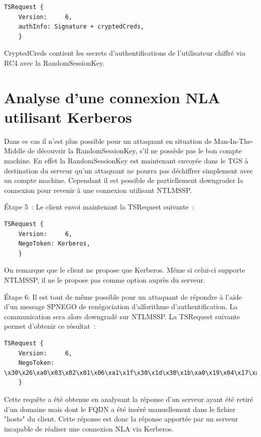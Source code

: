 \begin{lstlisting}[frame=single,basicstyle=\tiny]
TSRequest {
	Version:     6,
	authInfo: Signature + cryptedCreds,
	}
\end{lstlisting}


CryptedCreds contient les secrets d’authentifications de l’utilisateur chiffr\'e via RC4 avec la RandomSessionKey.

\section{Analyse d'une connexion NLA utilisant Kerberos}
Dans ce cas il n’est plus possible pour un attaquant en situation de Man-In-The-Middle de d\'ecouvrir la RandomSessionKey, s’il ne possède pas le bon compte machine. En effet la RandomSessionKey est maintenant envoyée dans le TGS à destination du serveur qu’un attaquant ne pourra pas déchiffrer simplement avec un compte machine.
Cependant il est possible de partiellement downgrader la connexion pour revenir à une connexion utilisant NTLMSSP.

Étape 5 :
Le client envoi maintenant la TSRequest suivante :

\begin{lstlisting}[frame=single,basicstyle=\tiny]
TSRequest {
	Version:     6,
	NegoToken: Kerberos,
	}
\end{lstlisting}


On remarque que le client ne propose que Kerberos. Même si celui-ci supporte NTLMSSP, il ne le propose pas comme option auprès du serveur.

Étape 6: 
Il est tout de même possible pour un attaquant de r\'epondre à l'aide d'un message SPNEGO de renégociation d'alforithme d'authentification. La communication sera alors downgradé sur NTLMSSP. La TSRequest suivante permet d'obtenir ce résultat :

\begin{lstlisting}[frame=single,basicstyle=\tiny]
TSRequest {
	Version:     6,
	NegoToken: \x30\x26\xa0\x03\x02\x01\x06\xa1\x1f\x30\x1d\x30\x1b\xa0\x19\x04\x17\xa1\x15\x30\x13\xa0\x03\x0a\x01\x03\xa1\x0c\x06\x0a\x2b\x06\x01\x04\x01\x82\x37\x02\x02\x0a,
	}
\end{lstlisting}


Cette requête a été obtenue en analysant la réponse d'un serveur ayant été retiré d'un domaine mais dont le FQDN a été inséré manuellement dans le fichier "hosts" du client. Cette réponse est donc la réponse apportée par un serveur incapable de réaliser une connexion NLA via Kerberos.


